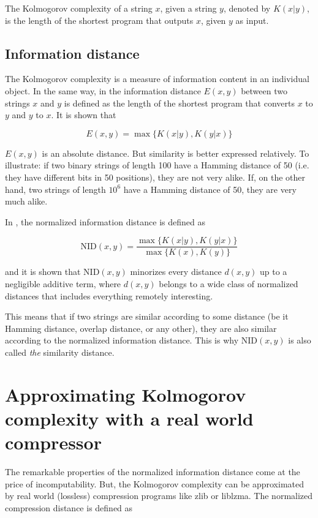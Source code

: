 The Kolmogorov complexity of a string $x$, given a string $y$, denoted by $K(x|y)$, is the length of the shortest program that outputs $x$, given $y$ as input.

\subsection{Information distance}

The Kolmogorov complexity is a measure of information content in an individual object. In the same way, in \cite{Bennett1998} the information distance $E(x, y)$ between two strings $x$ and $y$ is defined as the length of the shortest program that converts $x$ to $y$ and $y$ to $x$. It is shown that

$$ E(x, y) = \max \{ K(x|y), K(y|x) \} $$

$E(x, y)$ is an absolute distance. But similarity is better expressed relatively. To illustrate: if two binary strings of length 100 have a Hamming distance of 50 (i.e. they have different bits in 50 positions), they are not very alike. If, on the other hand, two strings of length $10^{6}$ have a Hamming distance of 50, they are very much alike.

In \cite{Li2004}, the normalized information distance is defined as

\begin{equation}\label{nid}
  \text{NID}(x, y) = \frac{\max \{ K(x|y), K(y|x) \}}{\max \{ K(x), K(y)\}}
\end{equation}

and it is shown that $ \text{NID}(x, y)$ minorizes every distance $d(x, y)$ up to a negligible additive term, where $d(x, y)$ belongs to a wide class of normalized distances that includes everything remotely interesting.

This means that if two strings are similar according to some distance (be it Hamming distance, overlap distance, or any other), they are also similar according to the normalized information distance. This is why $	\text{NID}(x, y)$ is also called \emph{the} similarity distance.

\section{Approximating Kolmogorov complexity with a real world compressor}

The remarkable properties of the normalized information distance come at the price of incomputability. But, the Kolmogorov complexity can be approximated by real world (lossless) compression programs like zlib or liblzma. The normalized compression distance \cite{Cilibrasi2005} is defined as

